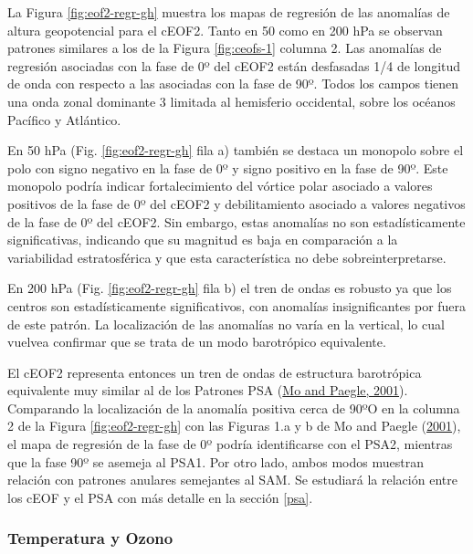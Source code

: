 \documentclass[12pt,oneside,a4paper]{reedthesis}
\begin{document}
La Figura \ref{fig:eof2-regr-gh} muestra los mapas de regresión de las anomalías de altura geopotencial para el cEOF2.
Tanto en 50 como en 200 hPa se observan patrones similares a los de la Figura \ref{fig:ceofs-1} columna 2.
Las anomalías de regresión asociadas con la fase de 0º del cEOF2 están desfasadas 1/4 de longitud de onda con respecto a las asociadas con la fase de 90º.
Todos los campos tienen una onda zonal dominante 3 limitada al hemisferio occidental, sobre los océanos Pacífico y Atlántico.

En 50 hPa (Fig. \ref{fig:eof2-regr-gh} fila a) también se destaca un monopolo sobre el polo con signo negativo en la fase de 0º y signo positivo en la fase de 90º.
Este monopolo podría indicar fortalecimiento del vórtice polar asociado a valores positivos de la fase de 0º del cEOF2 y debilitamiento asociado a valores negativos de la fase de 0º del cEOF2.
Sin embargo, estas anomalías no son estadísticamente significativas, indicando que su magnitud es baja en comparación a la variabilidad estratosférica y que esta característica no debe sobreinterpretarse.

En 200 hPa (Fig. \ref{fig:eof2-regr-gh} fila b) el tren de ondas es robusto ya que los centros son estadísticamente significativos, con anomalías insignificantes por fuera de este patrón.
La localización de las anomalías no varía en la vertical, lo cual vuelvea confirmar que se trata de un modo barotrópico equivalente.

El cEOF2 representa entonces un tren de ondas de estructura barotrópica equivalente muy similar al de los Patrones PSA (\protect\hyperlink{ref-mo2001}{Mo and Paegle, 2001}).
Comparando la localización de la anomalía positiva cerca de 90ºO en la columna 2 de la Figura \ref{fig:eof2-regr-gh} con las Figuras 1.a y b de Mo and Paegle (\protect\hyperlink{ref-mo2001}{2001}), el mapa de regresión de la fase de 0º podría identificarse con el PSA2, mientras que la fase 90º se asemeja al PSA1.
Por otro lado, ambos modos muestran relación con patrones anulares semejantes al SAM.
Se estudiará la relación entre los cEOF y el PSA con más detalle en la sección \ref{psa}.

\hypertarget{temperatura-y-ozono}{%
\subsubsection{Temperatura y Ozono}\label{temperatura-y-ozono}}
\end{document}
